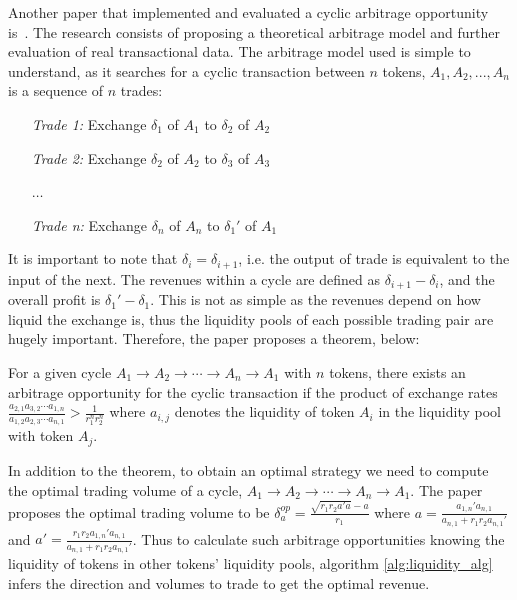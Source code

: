 \noindent Another paper that implemented and evaluated a cyclic arbitrage opportunity is~\cite{wang_cyclic_2022}. The research consists of proposing a theoretical arbitrage model and further evaluation of real transactional data. The arbitrage model used is simple to understand, as it searches for a cyclic transaction between $n$ tokens, $A_1, A_2, ..., A_n$ is a sequence of $n$ trades:
\begin{center}
    \begin{minipage}[c]{0.4\linewidth}
        \begin{itemize}
            \item[\textit{Trade 1:}] Exchange $\delta_1$ of $A_1$ to $\delta_2$ of $A_2$
            \item[\textit{Trade 2:}] Exchange $\delta_2$ of $A_2$ to $\delta_3$ of $A_3$
            \item[] $\dotsc$
            \item[\textit{Trade n:}] Exchange $\delta_n$ of $A_n$ to $\delta_1'$ of $A_1$
        \end{itemize}
    \end{minipage}
\end{center}

\noindent It is important to note that $\delta_i = \delta_{i+1}$, i.e. the output of trade is equivalent to the input of the next. The revenues within a cycle are defined as $\delta_{i+1} - \delta_i$, and the overall profit is $\delta_{1}' - \delta_1$. This is not as simple as the revenues depend on how liquid the exchange is, thus the liquidity pools of each possible trading pair are hugely important. Therefore, the paper proposes a theorem, below:

\begin{theorem}
    For a given cycle $A_1 \rightarrow A_2 \rightarrow \cdots \rightarrow A_n \rightarrow A_1$ with $n$ tokens, there exists an arbitrage opportunity for the cyclic transaction if the product of exchange rates $\frac{a_{2,1}a_{3,2}\cdots a_{1,n}}{a_{1,2}a_{2,3}\cdots a_{n, 1}} > \frac{1}{r_1^n r_2^n}$ where $a_{i,j}$ denotes the liquidity of token $A_i$ in the liquidity pool with token $A_j$.~\cite{wang_cyclic_2022}
\end{theorem}

\noindent In addition to the theorem, to obtain an optimal strategy we need to compute the optimal trading volume of a cycle, $A_1 \rightarrow A_2 \rightarrow \cdots \rightarrow A_n \rightarrow A_1$. The paper proposes the optimal trading volume to be $\delta^{op}_a = \frac{\sqrt{r_1 r_2 a' a} - a}{r_1}$ where $a = \frac{a_{1,n}'a_{n,1}}{a_{n,1}+r_1 r_2 a_{n,1}'}$ and $a' = \frac{r_1 r_2 a_{1,n}'a_{n,1}}{a_{n,1}+r_1 r_2 a_{n,1}'}$. Thus to calculate such arbitrage opportunities knowing the liquidity of tokens in other tokens' liquidity pools, algorithm \ref{alg:liquidity_alg} infers the direction and volumes to trade to get the optimal revenue.

